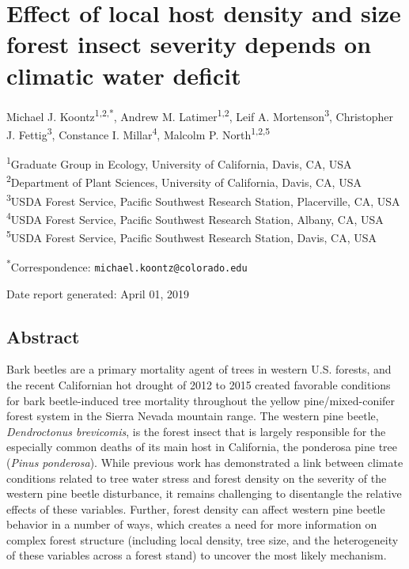 \documentclass[]{article}
\title{}
\author{}
\date{}
\begin{document}
\section{Effect of local host density and size forest insect severity
depends on climatic water
deficit}\label{effect-of-local-host-density-and-size-forest-insect-severity-depends-on-climatic-water-deficit}

Michael J. Koontz\textsuperscript{1,2,*}, Andrew M.
Latimer\textsuperscript{1,2}, Leif A. Mortenson\textsuperscript{3},
Christopher J. Fettig\textsuperscript{3}, Constance I.
Millar\textsuperscript{4}, Malcolm P. North\textsuperscript{1,2,5}

\textsuperscript{1}Graduate Group in Ecology, University of California,
Davis, CA, USA\\
\textsuperscript{2}Department of Plant Sciences, University of
California, Davis, CA, USA\\
\textsuperscript{3}USDA Forest Service, Pacific Southwest Research
Station, Placerville, CA, USA\\
\textsuperscript{4}USDA Forest Service, Pacific Southwest Research
Station, Albany, CA, USA\\
\textsuperscript{5}USDA Forest Service, Pacific Southwest Research
Station, Davis, CA, USA

\textsuperscript{*}Correspondence: \texttt{michael.koontz@colorado.edu}

Date report generated: April 01, 2019

\subsection{Abstract}\label{abstract}

Bark beetles are a primary mortality agent of trees in western U.S.
forests, and the recent Californian hot drought of 2012 to 2015 created
favorable conditions for bark beetle-induced tree mortality throughout
the yellow pine/mixed-conifer forest system in the Sierra Nevada
mountain range. The western pine beetle, \emph{Dendroctonus brevicomis},
is the forest insect that is largely responsible for the especially
common deaths of its main host in California, the ponderosa pine tree
(\emph{Pinus ponderosa}). While previous work has demonstrated a link
between climate conditions related to tree water stress and forest
density on the severity of the western pine beetle disturbance, it
remains challenging to disentangle the relative effects of these
variables. Further, forest density can affect western pine beetle
behavior in a number of ways, which creates a need for more information
on complex forest structure (including local density, tree size, and the
heterogeneity of these variables across a forest stand) to uncover the
most likely mechanism.
\end{document}

